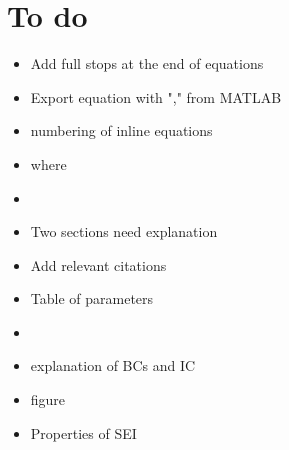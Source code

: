 \chapter{To do}

{\color{blue}
\begin{itemize}
    \item {\color{magenta}Add full stops at the end of equations}
    \item Export equation with "," from MATLAB
    \item {\color{magenta}numbering of inline equations}
    \item {\color{magenta}where}
    \item {\color{magenta}{unwanted vertical space}}
    \item Two sections need explanation
    \item Add relevant citations
    \item {\color{magenta}Table of parameters}
    \item {\color{magenta}{Write about SEI as well}}
    \item {\color{magenta}explanation of BCs and IC}
    \item {\color{magenta}figure}
    \item {\color{magenta}Properties of SEI}
\end{itemize}}